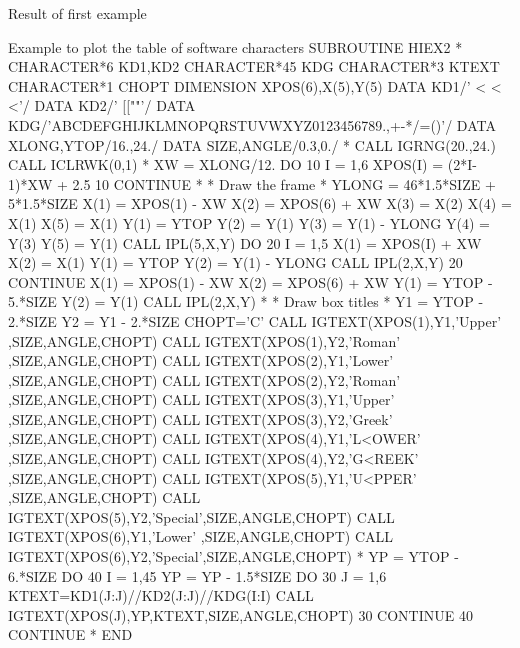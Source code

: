 \begin{minipage}{\textwidth}
\begin{Fighere}
\begin{center}\mbox{}\end{center}
\caption{Result of first \protect\HIGZ{} example}
\end{Fighere}
\end{minipage}

\newpage

\begin{XMPt}{Example to plot the table of \HIGZ{} software characters}
      SUBROUTINE HIEX2
*
      CHARACTER*6 KD1,KD2
      CHARACTER*45 KDG
      CHARACTER*3 KTEXT
      CHARACTER*1 CHOPT
      DIMENSION XPOS(6),X(5),Y(5)
      DATA KD1/' < < <'/
      DATA KD2/'  [[""'/
      DATA KDG/'ABCDEFGHIJKLMNOPQRSTUVWXYZ0123456789.,+-*/=()'/
      DATA XLONG,YTOP/16.,24./
      DATA SIZE,ANGLE/0.3,0./
*
      CALL IGRNG(20.,24.)
      CALL ICLRWK(0,1)
*
      XW = XLONG/12.
      DO 10 I = 1,6
         XPOS(I) = (2*I-1)*XW + 2.5
  10  CONTINUE
*
*              Draw the frame
*
      YLONG  = 46*1.5*SIZE + 5*1.5*SIZE
      X(1)   = XPOS(1) - XW
      X(2)   = XPOS(6) + XW
      X(3)   = X(2)
      X(4)   = X(1)
      X(5)   = X(1)
      Y(1)   = YTOP
      Y(2)   = Y(1)
      Y(3)   = Y(1) - YLONG
      Y(4)   = Y(3)
      Y(5)   = Y(1)
      CALL IPL(5,X,Y)
      DO 20 I = 1,5
         X(1)   = XPOS(I) + XW
         X(2)   = X(1)
         Y(1)   = YTOP
         Y(2)   = Y(1) - YLONG
         CALL IPL(2,X,Y)
  20  CONTINUE
      X(1)   = XPOS(1) - XW
      X(2)   = XPOS(6) + XW
      Y(1)   = YTOP - 5.*SIZE
      Y(2)   = Y(1)
      CALL IPL(2,X,Y)
*
*             Draw box titles
*
      Y1     = YTOP - 2.*SIZE
      Y2     = Y1 - 2.*SIZE
      CHOPT='C'
      CALL IGTEXT(XPOS(1),Y1,'Upper'  ,SIZE,ANGLE,CHOPT)
      CALL IGTEXT(XPOS(1),Y2,'Roman'  ,SIZE,ANGLE,CHOPT)
      CALL IGTEXT(XPOS(2),Y1,'Lower'  ,SIZE,ANGLE,CHOPT)
      CALL IGTEXT(XPOS(2),Y2,'Roman'  ,SIZE,ANGLE,CHOPT)
      CALL IGTEXT(XPOS(3),Y1,'Upper'  ,SIZE,ANGLE,CHOPT)
      CALL IGTEXT(XPOS(3),Y2,'Greek'  ,SIZE,ANGLE,CHOPT)
      CALL IGTEXT(XPOS(4),Y1,'L<OWER' ,SIZE,ANGLE,CHOPT)
      CALL IGTEXT(XPOS(4),Y2,'G<REEK' ,SIZE,ANGLE,CHOPT)
      CALL IGTEXT(XPOS(5),Y1,'U<PPER' ,SIZE,ANGLE,CHOPT)
      CALL IGTEXT(XPOS(5),Y2,'Special',SIZE,ANGLE,CHOPT)
      CALL IGTEXT(XPOS(6),Y1,'Lower'  ,SIZE,ANGLE,CHOPT)
      CALL IGTEXT(XPOS(6),Y2,'Special',SIZE,ANGLE,CHOPT)
*
      YP = YTOP - 6.*SIZE
      DO 40 I = 1,45
         YP = YP - 1.5*SIZE
         DO 30 J = 1,6
            KTEXT=KD1(J:J)//KD2(J:J)//KDG(I:I)
            CALL IGTEXT(XPOS(J),YP,KTEXT,SIZE,ANGLE,CHOPT)
  30     CONTINUE
  40  CONTINUE
*
      END
\end{XMPt}

